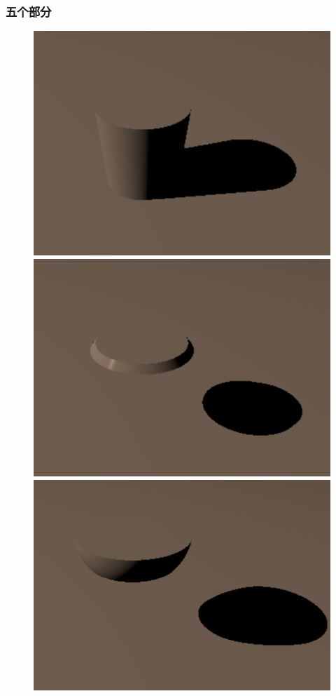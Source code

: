 \documentclass[aspectratio=169]{ctexbeamer} %
\begin{document}
\begin{frame}
    \frametitle{五个部分}
    \begin{figure}[htbp]
        \centering
        \includegraphics[height=.33\textheight]{images/pre/cone/cone1.pdf}
        \includegraphics[height=.33\textheight]{images/pre/cone/cone2.pdf}
        \includegraphics[height=.33\textheight]{images/pre/cone/bowl.pdf}

\end{figure}
\end{frame}
\end{document}
